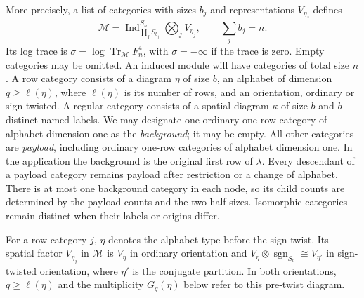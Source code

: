 More precisely, a list of categories with sizes $b_j$ and representations
$V_{\eta_j}$ defines
\[
 \mathcal M=\operatorname{Ind}_{\prod_jS_{b_j}}^{S_n}
                    \bigotimes_jV_{\eta_j},\qquad \sum_jb_j=n.
\]
Its log trace is $\sigma=\log\operatorname{Tr}_{\mathcal M}F_n^4$,
with $\sigma=-\infty$ if the trace is zero.  Empty categories may be
omitted.  An induced module will have categories of total size $n$.  A row
category consists of a diagram $\eta$ of size $b$, an alphabet of
dimension $q\ge\ell(\eta)$, where $\ell(\eta)$ is its number
of rows, and an orientation, ordinary or
sign-twisted.  A regular category consists of a spatial diagram $\kappa$ of
size $b$ and $b$ distinct named labels.  We may designate one ordinary
one-row category of alphabet dimension one as the \emph{background};
it may be empty.  All other categories are \emph{payload}, including
ordinary one-row categories of alphabet dimension one.  In the
application the background is the original first row of $\lambda$.
Every descendant of a payload category remains payload after
restriction or a change of alphabet.  There is at most one background
category in each node, so its child counts are determined by the payload
counts and the two half sizes.  Isomorphic categories remain distinct
when their labels or origins differ.

For a row category $j$, $\eta$ denotes the alphabet type before the
sign twist.  Its spatial factor $V_{\eta_j}$ in $\mathcal M$ is
$V_\eta$ in ordinary orientation and
$V_\eta\otimes\operatorname{sgn}_{S_b}\cong V_{\eta'}$ in sign-twisted
orientation, where $\eta'$ is the conjugate partition.  In both
orientations, $q\ge\ell(\eta)$ and the multiplicity $G_q(\eta)$ below
refer to this pre-twist diagram.

